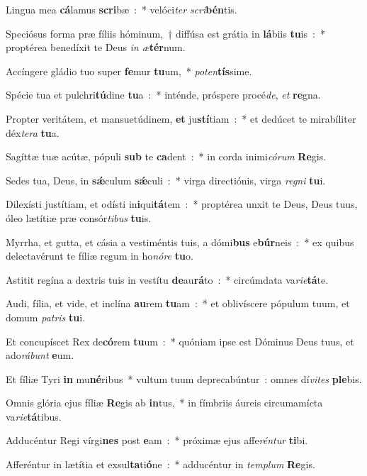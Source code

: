 \item Lingua mea \textbf{cá}lamus \textbf{scri}bæ~:~* velóci\emph{ter} \emph{scri}\textbf{bén}tis.
\item Speciósus forma præ fíliis hóminum,~† diffúsa est grátia in \textbf{lá}biis \textbf{tu}is~:~* proptérea benedíxit te Deus \emph{in} \emph{æ}\textbf{tér}num.
\item Accíngere gládio tuo super \textbf{fe}mur \textbf{tu}um,~* \emph{po}\emph{ten}\textbf{tís}sime.
\item Spécie tua et pulchri\textbf{tú}dine \textbf{tu}a~:~* inténde, próspere procé\emph{de}, \emph{et} \textbf{re}gna.
\item Propter veritátem, et mansuetúdinem, \textbf{et} ju\textbf{stí}tiam~:~* et dedúcet te mirabíliter déx\emph{te}\emph{ra} \textbf{tu}a.
\item Sagíttæ tuæ acútæ, pópuli \textbf{sub} te \textbf{ca}dent~:~* in corda inimi\emph{có}\emph{rum} \textbf{Re}gis.
\item Sedes tua, Deus, in \textbf{sǽ}culum \textbf{sǽ}culi~:~* virga directiónis, virga \emph{re}\emph{gni} \textbf{tu}i.
\item Dilexísti justítiam, et odísti in\textbf{i}qui\textbf{tá}tem~:~* proptérea unxit te Deus, Deus tuus, óleo lætítiæ præ consór\emph{ti}\emph{bus} \textbf{tu}is.
\item Myrrha, et gutta, et cásia a vestiméntis tuis, a dómi\textbf{bus} e\textbf{búr}neis~:~* ex quibus delectavérunt te fíliæ regum in ho\emph{nó}\emph{re} \textbf{tu}o.
\item Astitit regína a dextris tuis in vestítu \textbf{de}au\textbf{rá}to~:~* circúmdata va\emph{ri}\emph{e}\textbf{tá}te.
\item Audi, fília, et vide, et inclína \textbf{au}rem \textbf{tu}am~:~* et oblivíscere pópulum tuum, et domum \emph{pa}\emph{tris} \textbf{tu}i.
\item Et concupíscet Rex de\textbf{có}rem \textbf{tu}um~:~* quóniam ipse est Dóminus Deus tuus, et ado\emph{rá}\emph{bunt} \textbf{e}um.
\item Et fíliæ Tyri \textbf{in} mu\textbf{né}ribus~* vultum tuum deprecabúntur~: omnes dí\emph{vi}\emph{tes} \textbf{ple}bis.
\item Omnis glória ejus fíliæ \textbf{Re}gis ab \textbf{in}tus,~* in fímbriis áureis circumamícta va\emph{ri}\emph{e}\textbf{tá}tibus.
\item Adducéntur Regi vírgi\textbf{nes} post \textbf{e}am~:~* próximæ ejus affe\emph{rén}\emph{tur} \textbf{ti}bi.
\item Afferéntur in lætítia et exsul\textbf{ta}ti\textbf{ó}ne~:~* adducéntur in \emph{tem}\emph{plum} \textbf{Re}gis.
